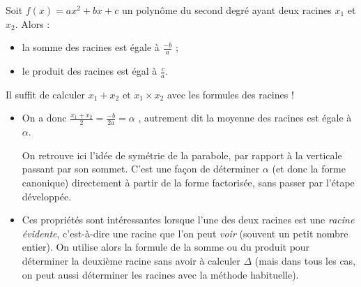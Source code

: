 \documentclass[a4paper,11pt]{article}
\begin{document}
\begin{cprop}
Soit $f(x)=ax^2+bx+c$ un polynôme du second degré ayant deux racines $x_1$ et $x_2$. Alors :
\begin{itemize} 
	\item la somme des racines est égale à $\frac{-b}{a}$ ;
	\item le produit des racines est égal à $\frac{c}{a}$.
\end{itemize}
\end{cprop}

\begin{cdemo}
Il suffit de calculer $x_1+x_2$ et $x_1 \times x_2$ avec les formules des racines !
\end{cdemo}

\begin{crmq}[s]
\begin{itemize}[leftmargin=*]
	\item On a donc $\frac{x_1+x_2}{2}=\frac{-b}{2a}=\alpha$ , autrement dit la moyenne des racines est égale à $\alpha$.
	
	\smallskip
	
	On retrouve ici l'idée de symétrie de la parabole, par rapport à la verticale passant par son sommet. C'est une façon de déterminer $\alpha$ (et donc la forme canonique) directement à partir de la forme factorisée, sans passer par l'étape développée.
	\item Ces propriétés sont intéressantes lorsque l'une des deux racines est une \emph{racine évidente}, c'est-à-dire une racine que l'on peut \emph{voir} (souvent un petit nombre entier). On utilise alors la formule de la somme ou du produit pour déterminer la deuxième racine sans avoir à calculer $\Delta$ (mais dans tous les cas, on peut aussi déterminer les racines avec la méthode habituelle).
\end{itemize}
\end{crmq}
\end{document}
